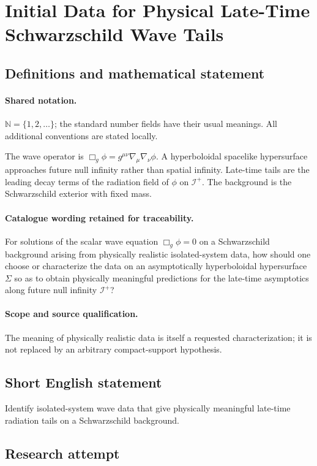\documentclass[11pt]{article}
\begin{document}
\section{Initial Data for Physical Late-Time Schwarzschild Wave Tails}\label{statement}

\subsection{Definitions and mathematical statement}

\paragraph{Shared notation.}$\mathbb N=\{1,2,\ldots\}$; the standard number fields have their usual meanings. All additional conventions are stated locally.


The wave operator is $\Box_g\phi=g^{\mu\nu}\nabla_\mu\nabla_\nu\phi$. A hyperboloidal spacelike hypersurface approaches future null infinity rather than spatial infinity. Late-time tails are the leading decay terms of the radiation field of $\phi$ on $\mathcal I^+$. The background is the Schwarzschild exterior with fixed mass.

\paragraph{Catalogue wording retained for traceability.}
For solutions of the scalar wave equation $\Box_g\phi=0$ on a Schwarzschild background arising from physically realistic isolated-system data, how should one choose or characterize the data on an asymptotically hyperboloidal hypersurface $\Sigma$ so as to obtain physically meaningful predictions for the late-time asymptotics along future null infinity $\mathcal{I}^+$?

\paragraph{Scope and source qualification.}The meaning of physically realistic data is itself a requested characterization; it is not replaced by an arbitrary compact-support hypothesis.
\subsection{Short English statement}
Identify isolated-system wave data that give physically meaningful late-time radiation tails on a Schwarzschild background.
\subsection{Research attempt}
\end{document}
